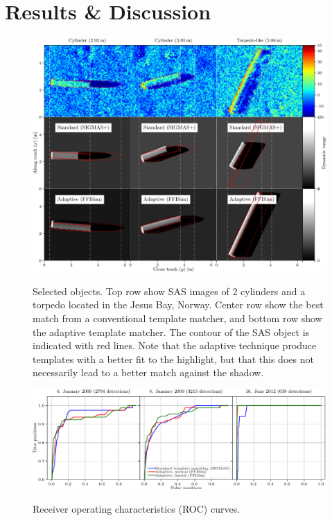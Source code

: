 \section{Results \& Discussion}

\begin{figure}[!tbp]\centering%
\includegraphics[width=\linewidth]{gfx/fig_images_sonar_simulator_tagged.svg}\label{fig_images_sonar_simulation}%
\caption{Selected objects. Top row show SAS images of 2 cylinders and a torpedo located in the Jesus Bay, Norway. Center row show the best match from a conventional template matcher, and bottom row show the adaptive template matcher. The contour of the SAS object is indicated with red lines. Note that the adaptive technique produce templates with a better fit to the highlight, but that this does not necessarily lead to a better match against the shadow.}
\end{figure}

\begin{figure}[!tbp]\centering%
\includegraphics[width=\linewidth]{gfx/fig_rocs.pdf}\label{fig_roc_curves}%
\caption{Receiver operating characteristics (ROC) curves.}
\end{figure}

